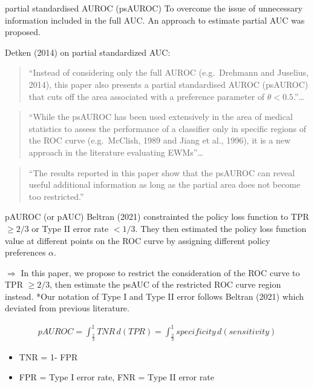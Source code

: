 \documentclass[
  ignorenonframetext,
]{beamer}
\providecommand{\tightlist}{%
  \setlength{\itemsep}{0pt}\setlength{\parskip}{0pt}}
\begin{document}
\begin{frame}{partial standardised AUROC (psAUROC)}
\protect\hypertarget{partial-standardised-auroc-psauroc}{}
To overcome the issue of unnecessary information included in the full
AUC. An approach to estimate partial AUC was proposed.

Detken (2014) on partial standardized AUC:

\begin{quote}
``Instead of considering only the full AUROC (e.g.~Drehmann and
Juselius, 2014), this paper also presents a partial standardised AUROC
(psAUROC) that cuts off the area associated with a preference parameter
of \(\theta<0.5\).''\ldots{}
\end{quote}

\begin{quote}
``While the psAUROC has been used extensively in the area of medical
statistics to assess the performance of a classifier only in specific
regions of the ROC curve (e.g.~McClish, 1989 and Jiang et al., 1996), it
is a new approach in the literature evaluating EWMs''\ldots{}
\end{quote}

\begin{quote}
``The results reported in this paper show that the psAUROC can reveal
useful additional information as long as the partial area does not
become too restricted.''
\end{quote}
\end{frame}

\begin{frame}{pAUROC (or pAUC)}
\protect\hypertarget{pauroc-or-pauc}{}
Beltran (2021) constrainted the policy loss function to TPR \(\ge 2/3\)
or Type II error rate \(< 1/3\). They then estimated the policy loss
function value at different points on the ROC curve by assigning
different policy preferences \(\alpha\).

\(\Rightarrow\) In this paper, we propose to restrict the consideration
of the ROC curve to TPR \(\ge 2/3\), then estimate the psAUC of the
restricted ROC curve region instead. *Our notation of Type I and Type II
error follows Beltran (2021) which deviated from previous literature.

\begin{align}
pAUROC = \int_{\frac{2}{3}}^1 TNR \, d(TPR) = \int_{\frac{2}{3}}^1 specificity \, d(sensitivity)
\end{align}

\begin{itemize}
\tightlist
\item
  TNR = 1- FPR
\item
  FPR = Type I error rate, FNR = Type II error rate
\end{itemize}
\end{frame}
\end{document}
